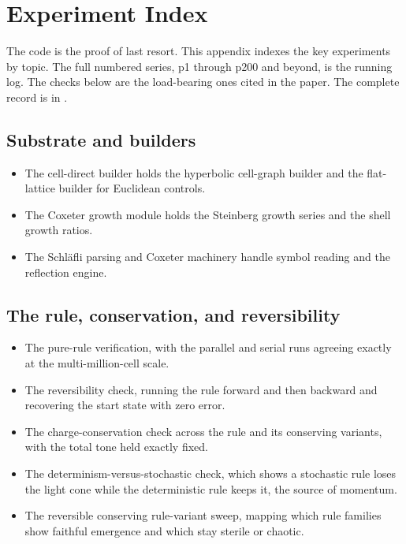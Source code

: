\section{Experiment Index}
\label{sec:experiment-index}

The code is the proof of last resort. This appendix indexes the key experiments by topic. The full numbered
series, p1 through p200 and beyond, is the running log. The checks below are the load-bearing ones cited in the
paper. The complete record is in \cite{pollard2026vibetest}.

\subsection{Substrate and builders}

\begin{itemize}
  \item The cell-direct builder holds the hyperbolic cell-graph builder and the flat-lattice builder for
  Euclidean controls.
  \item The Coxeter growth module holds the Steinberg growth series and the shell growth ratios.
  \item The Schl\"afli parsing and Coxeter machinery handle symbol reading and the reflection engine.
\end{itemize}

\subsection{The rule, conservation, and reversibility}

\begin{itemize}
  \item The pure-rule verification, with the parallel and serial runs agreeing exactly at the
  multi-million-cell scale.
  \item The reversibility check, running the rule forward and then backward and recovering the start state with
  zero error.
  \item The charge-conservation check across the rule and its conserving variants, with the total tone held
  exactly fixed.
  \item The determinism-versus-stochastic check, which shows a stochastic rule loses the light cone while the
  deterministic rule keeps it, the source of momentum.
  \item The reversible conserving rule-variant sweep, mapping which rule families show faithful emergence and
  which stay sterile or chaotic.
\end{itemize}

